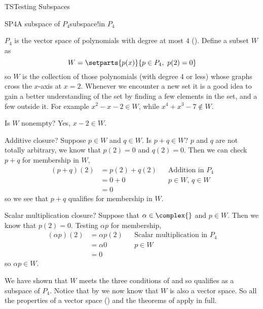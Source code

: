 \begin{subsect}{TS}{Testing Subspaces}
%
\begin{example}{SP4}{A subspace of $P_4$}{subspace!in $P_4$}
\begin{para}$P_4$ is the vector space of polynomials with degree at most $4$ ().  Define a subset $W$ as
%
\begin{equation*}
W=\setparts{p(x)}{p\in P_4,\ p(2)=0}
\end{equation*}
%
so $W$ is the collection of those polynomials (with degree 4 or less) whose graphs  cross the $x$-axis at $x=2$.  Whenever we encounter a new set it is a good idea to gain a better understanding of the set by finding a few elements in the set, and a few outside it.  For example $x^2-x-2\in W$, while $x^4+x^3-7\not\in W$.\end{para}
%
\begin{para}Is $W$ nonempty?  Yes, $x-2\in W$.\end{para}
%
\begin{para}Additive closure?  Suppose $p\in W$ and $q\in W$.  Is $p+q\in W$?  $p$ and $q$ are not totally arbitrary, we know that $p(2)=0$ and $q(2)=0$.  Then we can check $p+q$ for membership in $W$,
%
\begin{align*}
(p+q)(2)&=p(2)+q(2)&&\text{Addition in }P_4\\
&=0+0&&p\in W,\,q\in W\\
&=0
\end{align*}
%
so we see that $p+q$ qualifies for membership in $W$.\end{para}
%
\begin{para}Scalar multiplication closure?  Suppose that $\alpha\in\complex{\null}$ and $p\in W$.  Then we know that $p(2)=0$.  Testing $\alpha p$ for membership,
%
\begin{align*}
(\alpha p)(2)&=\alpha p(2)&&\text{Scalar multiplication in }P_4\\
&=\alpha 0&&p\in W\\
&=0
\end{align*}
%
so $\alpha p\in W$.\end{para}
%
\begin{para}We have shown that $W$ meets the three conditions of  and so qualifies as a subspace of $P_4$.  Notice that by  we now know that $W$ is also a vector space.  So all the properties of a vector space () and the theorems of  apply in full.\end{para}
%
\end{example}

\end{subsect}
